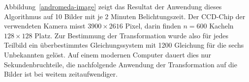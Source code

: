 Abbildung~\ref{andromeda-image} zeigt das Resultat der Anwendung dieses
Algorithmus auf 10 Bilder mit je 2 Minuten Belichtungszeit.
Der CCD-Chip der verwendeten Kamera misst $3900\times 2616$ Pixel, darin
finden $n=600$ Kacheln $128\times 128$ Platz.
Zur Bestimmung der Transformation wurde also für jedes Teilbild
ein überbestimmtes Gleichungssystem mit 1200 Gleichung für die
sechs Unbekannten gelöst. Auf einem modernen Computer dauert dies
nur Sekundenbruchteile, die nachfolgende Anwendung der Transformation
auf die Bilder ist bei weitem zeitaufwendiger.

